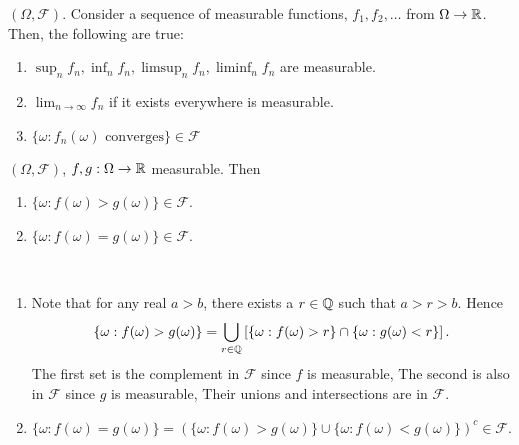 \documentclass[class=article,crop=false]{standalone}
\begin{document}
\begin{thm}[13.4]
	$ (\Omega,\mathcal{F})$. Consider a sequence of measurable functions, $ f_1,f_2,\ldots$ from $ \Omega \to \mathbb{R}$. Then, the following are true:
	\begin{enumerate}[label=(\roman*)]
		\item $ \sup_n f_n, \inf_n f_n, \limsup_{  n} f_n, \liminf_{  n} f_n $ are measurable.
		\item $ \lim_{ n \to \infty} f_n$ if it exists everywhere is measurable.
		\item $ \{\omega: f_n(\omega) \text{ converges} \} \in \mathcal{F}$
	\end{enumerate}
\end{thm}

\begin{thm}[]
	$ (\Omega,\mathcal{F})$, $ f,g : \Omega \to \mathbb{R}$ measurable. Then
	\begin{enumerate}[label=(\roman*)]
		\item $ \{\omega: f(\omega) > g(\omega)\} \in \mathcal{F} $.
		\item $ \{\omega: f(\omega) = g(\omega)\} \in \mathcal{F}$.
	\end{enumerate}
\end{thm}
\begin{prf}
~\begin{enumerate}[label=(\roman*)]
	\item Note that for any real $ a>b$, there exists a  $ r \in \mathbb{Q}$ such that $ a>r>b$. Hence
		 \[
			 \{\omega: f(\omega)> g(\omega)\} = \bigcup_{ r \in \mathbb{Q}} \left[ \{\omega: f(\omega )> r\} \cap \{\omega: g(\omega)<r\}  \right]   
		.\]
		The first set is the complement in $ \mathcal{F}$ since  $ f$ is measurable, The second is also in $ \mathcal{F}$ since  $ g$ is measurable, Their unions and intersections are in  $ \mathcal{F}$.
	\item 
		\[
			\{\omega: f(\omega)=g(\omega)\} = \left(\{\omega: f(\omega)> g(\omega)\} \cup  \{\omega: f(\omega)<g(\omega)\} \right)^{c} \in \mathcal{F}  
		.\] 
\end{enumerate}
\end{prf}
\end{document}
